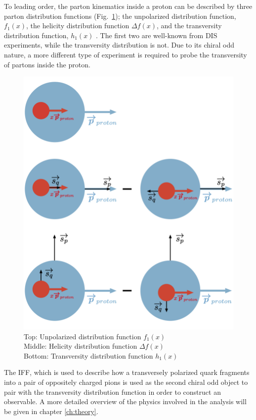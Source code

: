 \documentclass[letterpaper, abstract = on,listof=totoc, bibliography=totoc]{scrreprt}
\begin{document}
To leading order, the parton kinematics inside a proton can be described by three parton distribution functions (Fig.~\ref{fig:PDFs}); the unpolarized distribution function, $f_1(x)$, the helicity distribution function $\Delta f (x)$, and the transversity distribution function, $h_1(x)$ \cite{JaffeTONS}. The first two are well-known from DIS experiments, while the transversity distribution is not. Due to its chiral odd nature, a more different type of experiment is required to probe the transversity of partons inside the proton.  
\begin{figure}
\begin{center}
\includegraphics[width = .7\textwidth]{allDistsPic3}
\caption[Visual representation of unpolarized, helicity, and transversity distribution functions]{Top: Unpolarized distribution function $f_1(x)$ \\
Middle: Helicity distribution function $\Delta f(x)$ \\
Bottom: Transversity distribution function $h_1(x)$}
\label{fig:PDFs}
\end{center}
\end{figure}
The IFF, which is used to describe how a transversely polarized quark fragments into a pair of oppositely charged pions is used as the second chiral odd object to pair with the transversity distribution function in order to construct an observable. A more detailed overview of the physics involved in the analysis will be given in chapter \ref{ch:theory}.
\end{document}
